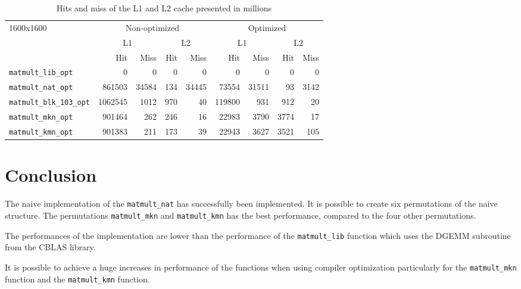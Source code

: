 \begin{table}[!th]
\centering
\begin{tabular}{l|rr|rr|rr|rr}
\multirow{3}{*}{1600x1600} & \multicolumn{4}{|c}{Non-optimized}& \multicolumn{4}{|c}{Optimized}\\
& \multicolumn{2}{|c}{L1} & \multicolumn{2}{|c}{L2}& \multicolumn{2}{|c}{L1} & \multicolumn{2}{|c}{L2} \\
& Hit& Miss& Hit& Miss& Hit& Miss& Hit& Miss\\ \hline
\texttt{matmult\_lib\_opt}&0& 0& 0& 0 &0& 0& 0& 0\\
\texttt{matmult\_nat\_opt}&861503 & 34584 & 134 & 34445 & 73554 & 31511 & 93 & 3142\\
\texttt{matmult\_blk\_103\_opt}&1062545 & 1012 & 970 & 40 & 119800 & 931 & 912 & 20\\
\texttt{matmult\_mkn\_opt}&901464 & 262 & 246 & 16 & 22983 & 3790 & 3774 & 17\\
\texttt{matmult\_kmn\_opt}&901383 & 211 & 173 & 39 & 22943 & 3627 & 3521 & 105\\
\end{tabular}
\caption{Hits and miss of the L1 and L2 cache presented in millions}
\label{tab:L1L2hitmis_compare}
\end{table}





\newpage
\section{Conclusion}

The naive implementation of the \texttt{matmult\_nat} has successfully been implemented. It is possible to create six permutations of the naive structure. The permutations \texttt{matmult\_mkn} and \texttt{matmult\_kmn} has the best performance, compared to the four other permutations.

The performances of the implementation are lower than the performance of the \texttt{matmult\_lib} function which uses the DGEMM subroutine from the CBLAS library.

It is possible to achieve a huge increases in performance of the functions when using compiler optimization particularly for the \texttt{matmult\_mkn} function and the \texttt{matmult\_kmn} function. 